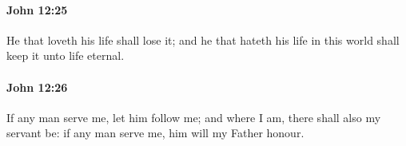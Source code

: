 		\paragraph{John 12:25} %
			\label{JOHN-12-25}

			He that loveth his life shall lose it; and he that hateth his life in this world shall keep it unto life eternal.

			\begin{framed}
				\scriptsize
				\begin{compactdesc}
					\item[SBLG] 
				\end{compactdesc}
			\end{framed}

		\paragraph{John 12:26} %
			\label{JOHN-12-26}

			If any man serve me, let him follow me; and where I am, there shall also my servant be: if any man serve me, him will my Father honour.

